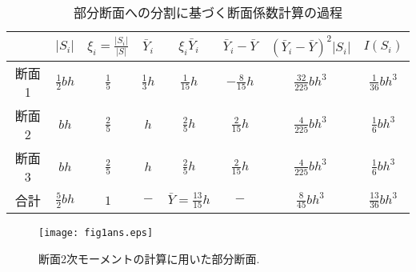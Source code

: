 \documentclass[10pt,a4j]{jarticle}
\begin{document}
\begin{table}
\begin{center}
	\caption{部分断面への分割に基づく断面係数計算の過程}
	\begin{tabular}{c||c|c|c|c|c|c|c}
		&
		$\left| S_i \right|$ & 
		$ \xi_i=\frac{\left| S_i \right|}{\left| S\right|} $  &
		$ \bar{Y}_i $ & 
		$ \xi_i\bar{Y}_i $ & 
		$\bar{Y}_i -\bar Y$ & 
		$ \left(\bar{Y}_i -\bar Y\right)^2\left| S_i \right|$ & 
		$ I(S_i)$  
		\\
		\hline 
		\hline 
		断面1&	
		$\frac{1}{2}bh$ & 
		$\frac{1}{5}$  &
		$\frac{1}{3}h$ & 
		$\frac{1}{15}h$ & 
		$-\frac{8}{15}h$ & 
		$\frac{32}{225}bh^3$ &
		$\frac{1}{36}bh^3$ 
		\\
		\hline
		断面2&	
		$bh$ & 
		$\frac{2}{5}$  &
		$h$ & 
		$\frac{2}{5}h $ & 
		$\frac{2}{15}h$ & 
		$\frac{4}{225}bh^3$ &
		$\frac{1}{6}bh^3$ 
		\\
		\hline 
		断面3&	
		$bh$ & 
		$\frac{2}{5}$  &
		$h$ & 
		$\frac{2}{5}h $ & 
		$\frac{2}{15}h$ & 
		$\frac{4}{225}bh^3$ &
		$\frac{1}{6}bh^3$ 
		\\
		\hline 
		\hline 
		合計&	
		$\frac{5}{2}bh$ & 
		$1$  &
		$-$ & 
		$\bar Y=\frac{13}{15}h $ & 
		$-$ & 
		$\frac{8}{45}bh^3$ &
		$\frac{13}{36}bh^3$ 
	\end{tabular}
\label{tbl:tbl2}
\end{center}
\end{table}
\begin{figure}[h]
	\begin{center}
	\texttt{[image: fig1ans.eps]} 
	\end{center}
	\caption{断面2次モーメントの計算に用いた部分断面.} 
	\label{fig:fig1}
\end{figure}
\end{document}
